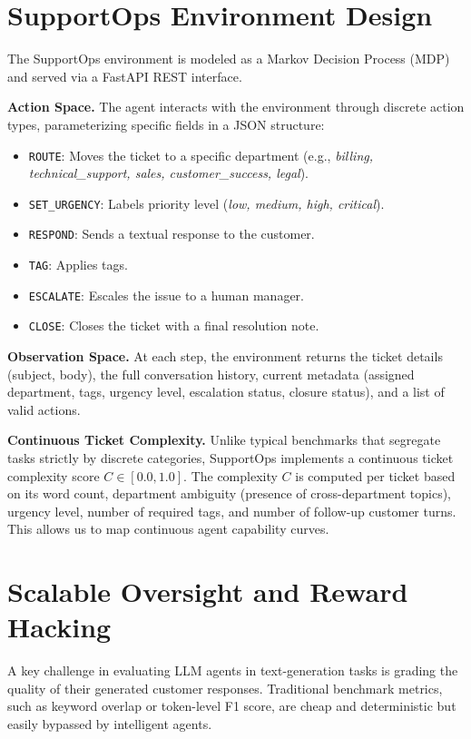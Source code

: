 \documentclass{article}
\begin{document}
\section{SupportOps Environment Design}

The SupportOps environment is modeled as a Markov Decision Process (MDP) and served via a FastAPI REST interface. 

\textbf{Action Space.} The agent interacts with the environment through discrete action types, parameterizing specific fields in a JSON structure:
\begin{itemize}[leftmargin=*]
  \item \texttt{ROUTE}: Moves the ticket to a specific department (e.g., \textit{billing, technical\_support, sales, customer\_success, legal}).
  \item \texttt{SET\_URGENCY}: Labels priority level (\textit{low, medium, high, critical}).
  \item \texttt{RESPOND}: Sends a textual response to the customer.
  \item \texttt{TAG}: Applies tags.
  \item \texttt{ESCALATE}: Escales the issue to a human manager.
  \item \texttt{CLOSE}: Closes the ticket with a final resolution note.
\end{itemize}

\textbf{Observation Space.} At each step, the environment returns the ticket details (subject, body), the full conversation history, current metadata (assigned department, tags, urgency level, escalation status, closure status), and a list of valid actions.

\textbf{Continuous Ticket Complexity.} Unlike typical benchmarks that segregate tasks strictly by discrete categories, SupportOps implements a continuous ticket complexity score $C \in [0.0, 1.0]$. The complexity $C$ is computed per ticket based on its word count, department ambiguity (presence of cross-department topics), urgency level, number of required tags, and number of follow-up customer turns. This allows us to map continuous agent capability curves.

\section{Scalable Oversight and Reward Hacking}

A key challenge in evaluating LLM agents in text-generation tasks is grading the quality of their generated customer responses. Traditional benchmark metrics, such as keyword overlap or token-level F1 score, are cheap and deterministic but easily bypassed by intelligent agents.
\end{document}
